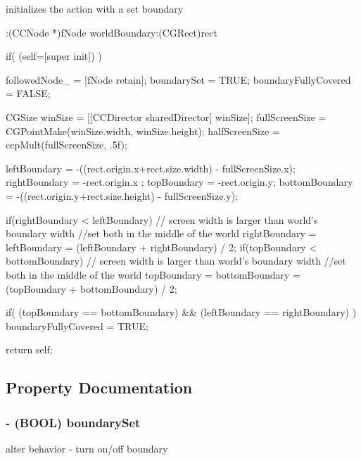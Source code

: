 initializes the action with a set boundary 
\begin{DoxyCode}
                    :(CCNode *)fNode worldBoundary:(CGRect)rect
{
        if( (self=[super init]) ) {

                followedNode_ = [fNode retain];
                boundarySet = TRUE;
                boundaryFullyCovered = FALSE;

                CGSize winSize = [[CCDirector sharedDirector] winSize];
                fullScreenSize = CGPointMake(winSize.width, winSize.height);
                halfScreenSize = ccpMult(fullScreenSize, .5f);

                leftBoundary = -((rect.origin.x+rect.size.width) - 
      fullScreenSize.x);
                rightBoundary = -rect.origin.x ;
                topBoundary = -rect.origin.y;
                bottomBoundary = -((rect.origin.y+rect.size.height) - 
      fullScreenSize.y);

                if(rightBoundary < leftBoundary)
                {
                        // screen width is larger than world's boundary width
                        //set both in the middle of the world
                        rightBoundary = leftBoundary = (leftBoundary + 
      rightBoundary) / 2;
                }
                if(topBoundary < bottomBoundary)
                {
                        // screen width is larger than world's boundary width
                        //set both in the middle of the world
                        topBoundary = bottomBoundary = (topBoundary + 
      bottomBoundary) / 2;
                }

                if( (topBoundary == bottomBoundary) && (leftBoundary == 
      rightBoundary) )
                        boundaryFullyCovered = TRUE;
        }

        return self;
}
\end{DoxyCode}


\subsection{Property Documentation}
\hypertarget{interface_c_c_follow_a2e8c9c693c6996f161a091b1dd6bf144}{
\subsubsection[{boundary\-Set}]{\setlength{\rightskip}{0pt plus 5cm}-\/ (B\-O\-O\-L) {\bf boundary\-Set}}}\label{interface_c_c_follow_a2e8c9c693c6996f161a091b1dd6bf144}
alter behavior -\/ turn on/off boundary 


